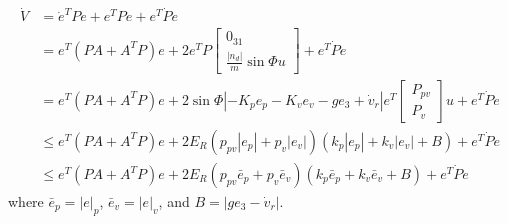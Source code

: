 \documentclass{article}
\begin{document}
\begin{align}
\dot{V} &= \dot{e}^TPe + e^TP\dot{e} + e^T\dot{P}e\nonumber \\
&= e^T(PA+A^TP)e + 
2e^TP\left[
\begin{array}{c}
0_{31} \\ \frac{|n_d|}{m}\sin\Phi u 
\end{array}
\right] +e^T\dot{P}e\nonumber \\
&= e^T(PA+A^TP)e + 2\sin\Phi|-K_p e_p -K_v e_v - ge_3 + \dot{v}_r|e^T
\left[
\begin{array}{c}
P_{pv} \\ P_v
\end{array}
\right]u
+ e^T\dot{P}e\nonumber \\
&\leq e^T(PA+A^TP)e+ 2E_R(p_{pv}|e_p|+p_v|e_v|)(k_p|e_p|+k_v|e_v|+B)+e^T\dot{P}e \nonumber  \\
&\leq e^T(PA+A^TP)e+ 2E_R(p_{pv}\bar{e}_p+p_v\bar{e}_v)(k_p\bar{e}_p+k_v\bar{e}_v+B)+e^T\dot{P}e \nonumber
\end{align}
where $\bar{e}_p = |e|_p$, $\bar{e}_v = |e|_v$, and $B = |ge_3-\dot{v}_r|$.
\end{document}
